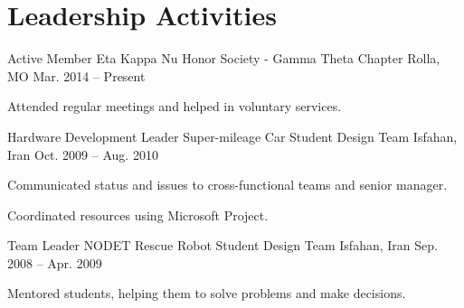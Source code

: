 \section{Leadership Activities}
\begin{cventries}
  \cventry
    {Active Member}
    {Eta Kappa Nu Honor Society - Gamma Theta Chapter}
    {Rolla, MO}
    {Mar. 2014 -- Present}
    {
      \begin{cvitems}
        \item Attended regular meetings and helped in voluntary services.
      \end{cvitems}
    }
  \cventry
    {Hardware Development Leader}
    {Super-mileage Car Student Design Team}
    {Isfahan, Iran}
    {Oct. 2009 -- Aug. 2010}
    {
      \begin{cvitems}
        \item Communicated status and issues to cross-functional teams and senior manager.
        \item Coordinated resources using Microsoft Project.
      \end{cvitems}
    }
  \cventry
    {Team Leader}
    {NODET Rescue Robot Student Design Team}
    {Isfahan, Iran}
    {Sep. 2008 -- Apr. 2009}
    {
      \begin{cvitems}
        \item Mentored students, helping them to solve problems and make decisions.
      \end{cvitems}
    }
\end{cventries} 